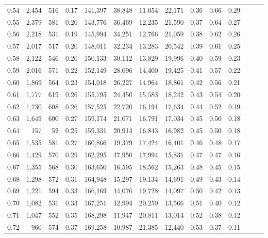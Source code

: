 \begin{tabular}{rrrrrrrrrrrrrr}
0.54 &  2,454 &  516 &  0.17 &  141,397 &   38,848 &  11,654 &  22,171 &  0.36 &  0.66 &      0.29 \\
0.55 &  2,379 &  581 &  0.20 &  143,776 &   36,469 &  12,235 &  21,590 &  0.37 &  0.64 &      0.27 \\
0.56 &  2,218 &  531 &  0.19 &  145,994 &   34,251 &  12,766 &  21,059 &  0.38 &  0.62 &      0.26 \\
0.57 &  2,017 &  517 &  0.20 &  148,011 &   32,234 &  13,283 &  20,542 &  0.39 &  0.61 &      0.25 \\
0.58 &  2,122 &  546 &  0.20 &  150,133 &   30,112 &  13,829 &  19,996 &  0.40 &  0.59 &      0.23 \\
0.59 &  2,016 &  571 &  0.22 &  152,149 &   28,096 &  14,400 &  19,425 &  0.41 &  0.57 &      0.22 \\
0.60 &  1,869 &  564 &  0.23 &  154,018 &   26,227 &  14,964 &  18,861 &  0.42 &  0.56 &      0.21 \\
0.61 &  1,777 &  619 &  0.26 &  155,795 &   24,450 &  15,583 &  18,242 &  0.43 &  0.54 &      0.20 \\
0.62 &  1,730 &  608 &  0.26 &  157,525 &   22,720 &  16,191 &  17,634 &  0.44 &  0.52 &      0.19 \\
0.63 &  1,649 &  600 &  0.27 &  159,174 &   21,071 &  16,791 &  17,034 &  0.45 &  0.50 &      0.18 \\
0.64 &    157 &   52 &  0.25 &  159,331 &   20,914 &  16,843 &  16,982 &  0.45 &  0.50 &      0.18 \\
0.65 &  1,535 &  581 &  0.27 &  160,866 &   19,379 &  17,424 &  16,401 &  0.46 &  0.48 &      0.17 \\
0.66 &  1,429 &  570 &  0.29 &  162,295 &   17,950 &  17,994 &  15,831 &  0.47 &  0.47 &      0.16 \\
0.67 &  1,355 &  568 &  0.30 &  163,650 &   16,595 &  18,562 &  15,263 &  0.48 &  0.45 &      0.15 \\
0.68 &  1,298 &  572 &  0.31 &  164,948 &   15,297 &  19,134 &  14,691 &  0.49 &  0.43 &      0.14 \\
0.69 &  1,221 &  594 &  0.33 &  166,169 &   14,076 &  19,728 &  14,097 &  0.50 &  0.42 &      0.13 \\
0.70 &  1,082 &  531 &  0.33 &  167,251 &   12,994 &  20,259 &  13,566 &  0.51 &  0.40 &      0.12 \\
0.71 &  1,047 &  552 &  0.35 &  168,298 &   11,947 &  20,811 &  13,014 &  0.52 &  0.38 &      0.12 \\
0.72 &    960 &  574 &  0.37 &  169,258 &   10,987 &  21,385 &  12,440 &  0.53 &  0.37 &      0.11 \\

\end{tabular}
